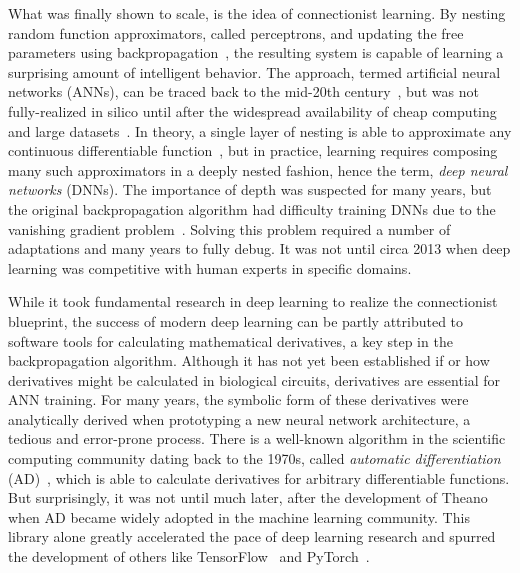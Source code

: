 \documentclass[12pt,initial,twoside,maitrise]{dms}
\numberwithin{equation}{section}
\numberwithin{table}{chapter}
\numberwithin{figure}{chapter}
\begin{document}
What was finally shown to scale, is the idea of connectionist learning. By nesting random function approximators, called perceptrons, and updating the free parameters using backpropagation~\citep{werbos1990backpropagation, rumelhart1988learning}, the resulting system is capable of learning a surprising amount of intelligent behavior. The approach, termed artificial neural networks (ANNs), can be traced back to the mid-20th century~\citep{ivakhnenko1965cybernetic, rosenblatt1958perceptron}, but was not fully-realized in silico until after the widespread availability of cheap computing and large datasets~\citep{lecun2015deep}. In theory, a single layer of nesting is able to approximate any continuous differentiable function~\citep{hornik1989multilayer}, but in practice, learning requires composing many such approximators in a deeply nested fashion, hence the term, \textit{deep neural networks} (DNNs). The importance of depth was suspected for many years, but the original backpropagation algorithm had difficulty training DNNs due to the vanishing gradient problem~\citep{bengio1994learning}. Solving this problem required a number of adaptations and many years to fully debug. It was not until circa 2013 when deep learning was competitive with human experts in specific domains.

While it took fundamental research in deep learning to realize the connectionist blueprint, the success of modern deep learning can be partly attributed to software tools for calculating mathematical derivatives, a key step in the backpropagation algorithm. Although it has not yet been established if or how derivatives might be calculated in biological circuits, derivatives are essential for ANN training. For many years, the symbolic form of these derivatives were analytically derived when prototyping a new neural network architecture, a tedious and error-prone process. There is a well-known algorithm in the scientific computing community dating back to the 1970s, called \textit{automatic differentiation} (AD)~\citep{linnainmaa1970representation, griewank1989automatic}, which is able to calculate derivatives for arbitrary differentiable functions. But surprisingly, it was not until much later, after the development of Theano~\citep{bergstra2010theano} when AD became widely adopted in the machine learning community. This library alone greatly accelerated the pace of deep learning research and spurred the development of others like TensorFlow~\citep{abadi2016tensorflow} and PyTorch~\citep{paszke2017automatic}.
\end{document}
